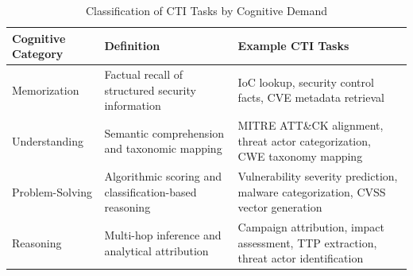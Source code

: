 \documentclass[5p,times,authoryear]{elsarticle}
\begin{document}

\begin{table}[t]
\centering
\caption{Classification of CTI Tasks by Cognitive Demand}
\label{tab:cti-tasks}
\small
\setlength{\tabcolsep}{3pt}
\renewcommand{\arraystretch}{1.15}
\begin{tabular}{p{}
                p{}
                p{}}
\hline
\textbf{Cognitive Category} &
\textbf{Definition} &
\textbf{Example CTI Tasks} \\
\hline

Memorization &
Factual recall of structured security information &
IoC lookup, security control facts, CVE metadata retrieval \\

\hline
Understanding &
Semantic comprehension and taxonomic mapping &
MITRE ATT\&CK alignment, threat actor categorization, CWE taxonomy mapping \\

\hline
Problem-Solving &
Algorithmic scoring and classification-based reasoning &
Vulnerability severity prediction, malware categorization, CVSS vector generation \\

\hline
Reasoning &
Multi-hop inference and analytical attribution &
Campaign attribution, impact assessment, TTP extraction, threat actor identification \\

\hline
\end{tabular}
\end{table}



\end{document}
